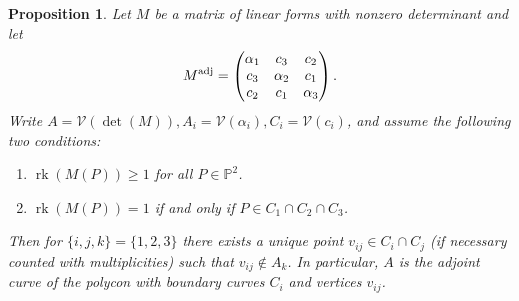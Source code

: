 \documentclass[a4paper,10pt]{amsart}
\theoremstyle{definition}
\theoremstyle{plain}
\newtheorem{prop}[defin]{Proposition}
\newcommand{\rk}{\operatorname{rk}}
\newcommand{\cV}{{\mathcal V}}
\newcommand{\pp}{\mathbb{P}}
\begin{document}
\begin{prop} \label{prop:PolyconFromLDR}
 Let $M$ be a matrix of linear forms with nonzero determinant and let
 \begin{equation*}
     M^{\textup{adj}} = \begin{pmatrix}
         \alpha_1 & c_3 & c_2 \\
         c_3 & \alpha_2 & c_1 \\
         c_2 & c_1 & \alpha_3
     \end{pmatrix}.
 \end{equation*}
 Write $A = \cV(\det(M)), A_i = \cV(\alpha_i), C_i = \cV(c_i)$, and assume the following two conditions:
 \begin{enumerate}
     \item $\rk(M(P)) \geq 1$ for all $P \in \pp^2$.
     \item $\rk(M(P)) = 1$ if and only if $P \in C_1 \cap C_2 \cap C_3$.
 \end{enumerate}
 Then for $\{i,j,k\} = \{1,2,3\}$ there exists a unique point $v_{ij} \in C_i\cap C_j$ (if necessary counted with multiplicities) such that $v_{ij} \not \in A_k$. In particular, $A$ is the adjoint curve of the polycon with boundary curves $C_i$ and vertices $v_{ij}$.
\end{prop}
\end{document}
